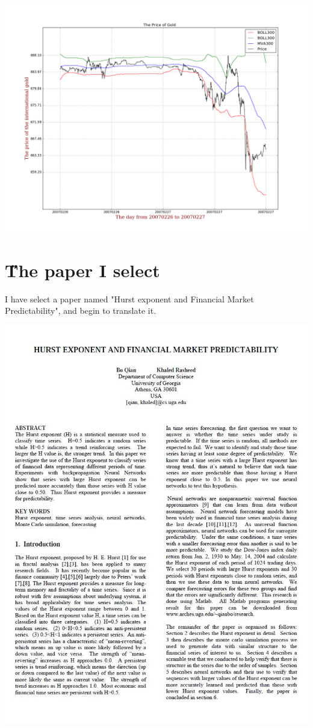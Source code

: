 \documentclass[12pt]{article}
\begin{document}
\includegraphics[width=5.5in]{2.png}

\section{\H The paper I select}
I have select a paper named "Hurst exponent and Financial Market Predictability", and begin to translate it.

\includegraphics[width=6.5in]{3.jpg}
\end{document}

